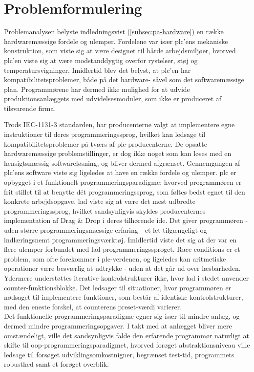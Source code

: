 \section{Problemformulering}
Problemanalysen belyste indledningsvist (\ref{subsec:pa-hardware}) en række hardwaremæssige fordele og ulemper. Fordelene var især \gls{plc}'ens mekaniske konstruktion, som viste sig at være designet til hårde arbejdsmiljøer, hvorved \gls{plc}'en viste sig at være modstanddygtig overfor rystelser, støj og temperatursvigninger. Imidlertid blev det belyst, at \gls{plc}'en har kompatibilitetsproblemer, både på det hardware- såvel som det softwaremæssige plan. Programmørene har dermed ikke mulighed for at udvide produktionsanlæggets med udvidelsesmoduler, som ikke er produceret af tilsvarende firma.

Trods IEC-1131-3 standarden, har producenterne valgt at implementere egne instruktioner til deres programmeringssprog, hvilket kan ledsage til kompatibilitetsproblemer på tværs af \gls{plc}-producenterne. De opsatte hardwaremæssige problemstillinger, er dog ikke noget som kan løses med en hensigtsmæssig softwareløsning, og bliver dermed afgrænset. 
Gennemgangen af \gls{plc}'ens software viste sig ligeledes at have en række fordele og ulemper. \gls{plc} er opbygget i et funktionelt programmeringsparadigme; hvorved programmøren er frit stillet til at benytte dét programmeringssprog, som føltes bedst egnet til den konkrete arbejdsopgave. \gls{lad} viste sig at være det mest udbredte programmeringssprog, hvilket sandsynligvis skyldes producenternes implementation af Drag \& Drop i deres tilhørende \gls{ide}. Det giver programmøren - uden større programmeringsmæssige erfaring - et let tilgængeligt og indlæringsnemt programmeringsværktøj. Imidlertid viste det sig at der var en flere ulemper forbundet med \gls{lad}-programmeringssproget. Race-conditions er et problem, som ofte forekommer i \gls{plc}-verdenen, og ligeledes kan aritmetiske operationer være besværlig at udtrykke - uden at det går ud over læsbarheden. Ydermere understøttes iterative kontrolstrukturer ikke, hvor \gls{lad} i stedet anvender counter-funktionsblokke. Det ledsager til situationer, hvor programmøren er nødsaget til implementere funktioner, som består af identiske kontrolstrukturer, med den eneste forskel, at counterens preset-værdi varierer. \\

\noindent Det funktionelle programmeringsparadigme egner sig især til mindre anlæg, og dermed mindre programmeringsopgaver. I takt med at anlægget bliver mere omstændeligt, ville det sandsynligvis falde den erfarende programmør naturligt at skifte til \gls{oop}-programmeringsparadigmet, hvorved forøget abstraktionsniveau ville ledsage til forsøget udviklingsomkostnigner, begrænset test-tid, programmets robusthed samt et forøget overblik. 

